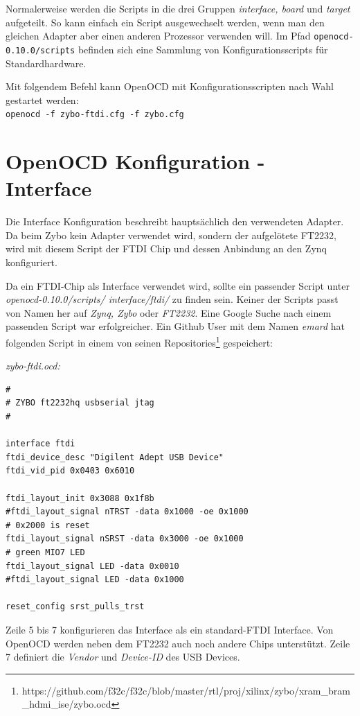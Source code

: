 Normalerweise werden die Scripts in die drei Gruppen \textit{interface, board} und \textit{target} aufgeteilt.
So kann einfach ein Script ausgewechselt werden, wenn man den gleichen Adapter aber einen anderen Prozessor verwenden will.
Im Pfad \texttt{openocd-0.10.0/scripts} befinden sich eine Sammlung von Konfigurationsscripts für Standardhardware.

Mit folgendem Befehl kann OpenOCD mit Konfigurationsscripten nach Wahl gestartet werden:\\
\texttt{openocd -f zybo-ftdi.cfg -f zybo.cfg}


\section{OpenOCD Konfiguration - Interface}
Die Interface Konfiguration beschreibt hauptsächlich den verwendeten Adapter.
Da beim Zybo kein Adapter verwendet wird, sondern der aufgelötete FT2232, wird mit diesem Script der FTDI Chip und dessen Anbindung an den Zynq konfiguriert.

Da ein FTDI-Chip als Interface verwendet wird, sollte ein passender Script unter \textit{openocd-0.10.0/scripts/ interface/ftdi/} zu finden sein.
Keiner der Scripts passt von Namen her auf \textit{Zynq, Zybo} oder \textit{FT2232}.
Eine Google Suche nach einem passenden Script war erfolgreicher.
Ein Github User mit dem Namen \textit{emard} hat folgenden Script in einem von seinen Repositories\footnote{https://github.com/f32c/f32c/blob/master/rtl/proj/xilinx/zybo/xram\_bram\_hdmi\_ise/zybo.ocd} gespeichert:

\textit{zybo-ftdi.ocd:}
\begin{lstlisting}
#
# ZYBO ft2232hq usbserial jtag
#

interface ftdi
ftdi_device_desc "Digilent Adept USB Device"
ftdi_vid_pid 0x0403 0x6010

ftdi_layout_init 0x3088 0x1f8b
#ftdi_layout_signal nTRST -data 0x1000 -oe 0x1000
# 0x2000 is reset
ftdi_layout_signal nSRST -data 0x3000 -oe 0x1000
# green MIO7 LED
ftdi_layout_signal LED -data 0x0010
#ftdi_layout_signal LED -data 0x1000

reset_config srst_pulls_trst

\end{lstlisting}

Zeile 5 bis 7 konfigurieren das Interface als ein standard-FTDI Interface.
Von OpenOCD werden neben dem FT2232 auch noch andere Chips unterstützt.
Zeile 7 definiert die \textit{Vendor} und \textit{Device-ID} des USB Devices.


